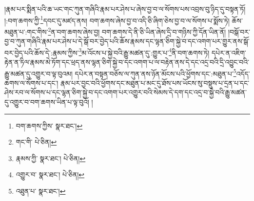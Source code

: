 །རྣམ་པར་སྨིན་པའི་ཆ་ཡང་གང་ཀུན་གཞིའི་རྣམ་པར་ཤེས་པ་ཞེས་བྱ་བ་ལ་སོགས་པས་འབྲས་བུ་ཉིད་དུ་བསྟན་ཏོ། །:བག་ཆགས་ཀྱི་\footnote{བག་ཆགས་ཀྱིས་  སྣར་ཐང་། }དབང་དུ་མཛད་ནས། བག་ཆགས་ཞེས་བྱ་བ་འདི་ཅི་ཞིག་ཅེས་བྱ་བ་ལ་སོགས་པ་སྨོས་ཏེ། ཆོས་མཐུན་པ་:གང་གིས་\footnote{གང་གི་  པེ་ཅིན། }ན་བག་ཆགས་ཞེས་བྱ། བག་ཆགས་དེ་ནི་ཅི་ཡིན་ཞེས་དྲི་བ་གཉིས་ཀྱི་དོན་ཡིན་ནོ། །བསྒོ་བར་བྱ་བ་ཀུན་གཞིའི་རྣམ་པར་ཤེས་པ་དེ་སྒོ་བར་བྱེད་པའི་ཆོས་རྣམས་དང་ལྷན་ཅིག་སྐྱེ་བ་དང་འགག་པར་གྱུར་ནས་སྒོ་བར་བྱེད་པའི་ཆོས་དེ་:རྣམས་ཀྱིས་\footnote{རྣམས་ཀྱི་  སྣར་ཐང་།  པེ་ཅིན། }མ་འོངས་པ་སྐྱེ་བའི་རྒྱུ་མཚན་དུ་:གྱུར་པ་\footnote{འགྱུར་བ་  སྣར་ཐང་།  པེ་ཅིན། }ནི་བག་ཆགས་ཏེ། དཔེར་ན་འཇིག་རྟེན་ན་ཏིལ་རྣམས་མེ་ཏོག་དང་ཕྲད་ནས་ལྷན་ཅིག་སྐྱེ་བ་དང་འགག་པ་ལ་བརྟེན་ནས་དེ་དང་འདྲ་བའི་དྲི་འབྱུང་བའི་རྒྱུ་མཚན་དུ་འགྱུར་བ་ལྟ་བུའམ། དཔེར་ན་བསྟན་བཅོས་ལ་ཀུན་ནས་ཉོན་མོངས་པའི་ཕྱོགས་དང་:མཐུན་པ་\footnote{འཐུན་པ་  སྣར་ཐང་། }འདོད་ཆགས་ལ་སོགས་པ་དང་། རྣམ་པར་བྱང་བའི་ཕྱོགས་དང་མཐུན་པ་མང་དུ་ཐོས་པས་ཡོངས་སུ་བསྡུས་པ་དྲན་པ་དང་ཤེས་རབ་ལ་སོགས་པ་དང་ལྷན་ཅིག་སྐྱེ་བ་དང་འགག་པར་འགྱུར་བའི་སེམས་དེ་དག་དང་འདྲ་བ་སྐྱེ་བའི་རྒྱུ་མཚན་དུ་འགྱུར་བ་བག་ཆགས་ཡིན་པ་ལྟ་བུའོ། །
